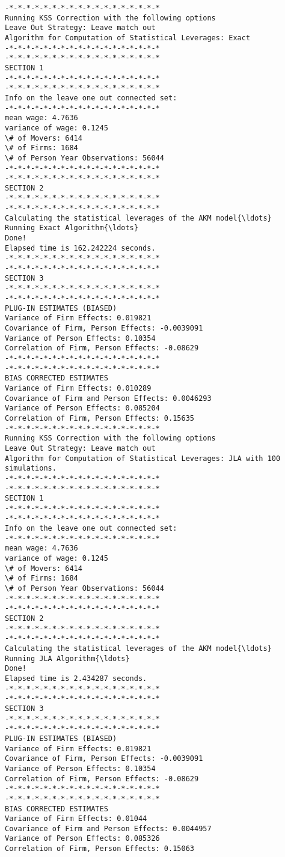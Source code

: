 \documentclass[11pt]{article}
\begin{document}
    \begin{Verbatim}[commandchars=\\\{\}]
-*-*-*-*-*-*-*-*-*-*-*-*-*-*-*-*-*-*
Running KSS Correction with the following options
Leave Out Strategy: Leave match out
Algorithm for Computation of Statistical Leverages: Exact
-*-*-*-*-*-*-*-*-*-*-*-*-*-*-*-*-*-*
-*-*-*-*-*-*-*-*-*-*-*-*-*-*-*-*-*-*
SECTION 1
-*-*-*-*-*-*-*-*-*-*-*-*-*-*-*-*-*-*
-*-*-*-*-*-*-*-*-*-*-*-*-*-*-*-*-*-*
Info on the leave one out connected set:
-*-*-*-*-*-*-*-*-*-*-*-*-*-*-*-*-*-*
mean wage: 4.7636
variance of wage: 0.1245
\# of Movers: 6414
\# of Firms: 1684
\# of Person Year Observations: 56044
-*-*-*-*-*-*-*-*-*-*-*-*-*-*-*-*-*-*
-*-*-*-*-*-*-*-*-*-*-*-*-*-*-*-*-*-*
SECTION 2
-*-*-*-*-*-*-*-*-*-*-*-*-*-*-*-*-*-*
-*-*-*-*-*-*-*-*-*-*-*-*-*-*-*-*-*-*
Calculating the statistical leverages of the AKM model{\ldots}
Running Exact Algorithm{\ldots}
Done!
Elapsed time is 162.242224 seconds.
-*-*-*-*-*-*-*-*-*-*-*-*-*-*-*-*-*-*
-*-*-*-*-*-*-*-*-*-*-*-*-*-*-*-*-*-*
SECTION 3
-*-*-*-*-*-*-*-*-*-*-*-*-*-*-*-*-*-*
-*-*-*-*-*-*-*-*-*-*-*-*-*-*-*-*-*-*
PLUG-IN ESTIMATES (BIASED)
Variance of Firm Effects: 0.019821
Covariance of Firm, Person Effects: -0.0039091
Variance of Person Effects: 0.10354
Correlation of Firm, Person Effects: -0.08629
-*-*-*-*-*-*-*-*-*-*-*-*-*-*-*-*-*-*
-*-*-*-*-*-*-*-*-*-*-*-*-*-*-*-*-*-*
BIAS CORRECTED ESTIMATES
Variance of Firm Effects: 0.010289
Covariance of Firm and Person Effects: 0.0046293
Variance of Person Effects: 0.085204
Correlation of Firm, Person Effects: 0.15635
-*-*-*-*-*-*-*-*-*-*-*-*-*-*-*-*-*-*
Running KSS Correction with the following options
Leave Out Strategy: Leave match out
Algorithm for Computation of Statistical Leverages: JLA with 100 simulations.
-*-*-*-*-*-*-*-*-*-*-*-*-*-*-*-*-*-*
-*-*-*-*-*-*-*-*-*-*-*-*-*-*-*-*-*-*
SECTION 1
-*-*-*-*-*-*-*-*-*-*-*-*-*-*-*-*-*-*
-*-*-*-*-*-*-*-*-*-*-*-*-*-*-*-*-*-*
Info on the leave one out connected set:
-*-*-*-*-*-*-*-*-*-*-*-*-*-*-*-*-*-*
mean wage: 4.7636
variance of wage: 0.1245
\# of Movers: 6414
\# of Firms: 1684
\# of Person Year Observations: 56044
-*-*-*-*-*-*-*-*-*-*-*-*-*-*-*-*-*-*
-*-*-*-*-*-*-*-*-*-*-*-*-*-*-*-*-*-*
SECTION 2
-*-*-*-*-*-*-*-*-*-*-*-*-*-*-*-*-*-*
-*-*-*-*-*-*-*-*-*-*-*-*-*-*-*-*-*-*
Calculating the statistical leverages of the AKM model{\ldots}
Running JLA Algorithm{\ldots}
Done!
Elapsed time is 2.434287 seconds.
-*-*-*-*-*-*-*-*-*-*-*-*-*-*-*-*-*-*
-*-*-*-*-*-*-*-*-*-*-*-*-*-*-*-*-*-*
SECTION 3
-*-*-*-*-*-*-*-*-*-*-*-*-*-*-*-*-*-*
-*-*-*-*-*-*-*-*-*-*-*-*-*-*-*-*-*-*
PLUG-IN ESTIMATES (BIASED)
Variance of Firm Effects: 0.019821
Covariance of Firm, Person Effects: -0.0039091
Variance of Person Effects: 0.10354
Correlation of Firm, Person Effects: -0.08629
-*-*-*-*-*-*-*-*-*-*-*-*-*-*-*-*-*-*
-*-*-*-*-*-*-*-*-*-*-*-*-*-*-*-*-*-*
BIAS CORRECTED ESTIMATES
Variance of Firm Effects: 0.01044
Covariance of Firm and Person Effects: 0.0044957
Variance of Person Effects: 0.085326
Correlation of Firm, Person Effects: 0.15063
    \end{Verbatim}
\end{document}
